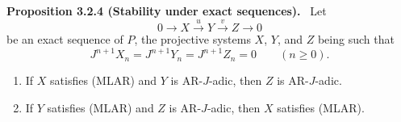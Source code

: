 \documentclass[11pt]{article}
\newenvironment{statement}[1]{\par\medskip\noindent\textbf{#1.}\ }{\par\medskip}
\begin{document}
\label{sga5:V:proposition:3.2.4}\begin{statement}{Proposition 3.2.4 (Stability under exact sequences)}
Let
\[
0\longrightarrow X\stackrel{u}{\longrightarrow}Y\stackrel{v}{\longrightarrow}Z\longrightarrow0
\]
be an exact sequence of $P$, the projective systems $X$, $Y$, and $Z$ being such that
\[
J^{n+1}X_n=J^{n+1}Y_n=J^{n+1}Z_n=0\qquad(n\ge0).
\]
\begin{enumerate}[label=(\roman*)]
\item If $X$ satisfies (MLAR) and $Y$ is AR-$J$-adic, then $Z$ is AR-$J$-adic.
\item If $Y$ satisfies (MLAR) and $Z$ is AR-$J$-adic, then $X$ satisfies (MLAR).
\end{enumerate}
\end{statement}
\end{document}
